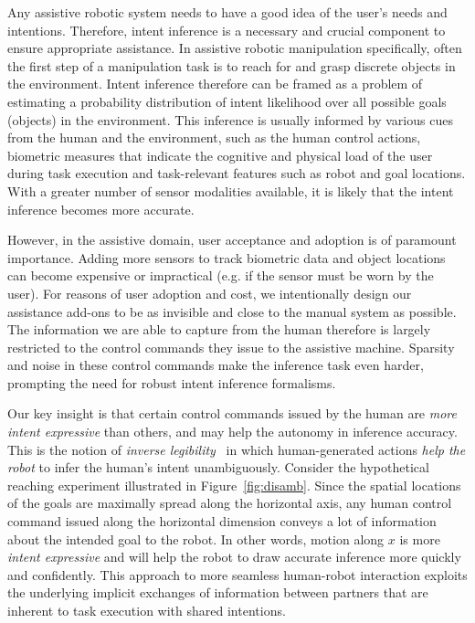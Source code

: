 \documentclass[natbib, twocolumn]{svjour3}          %
\begin{document}
Any assistive robotic system needs to have a good idea of the user's needs and intentions. Therefore, intent inference is a necessary and crucial component to ensure appropriate assistance. In assistive robotic manipulation specifically, often the first step of a manipulation task is to reach for and grasp discrete objects in the environment. Intent inference therefore can be framed as a problem of estimating a probability distribution of intent likelihood over all possible goals (objects) in the environment. This inference is usually informed by various cues from the human and the environment, such as the human control actions, biometric measures that indicate the cognitive and physical load of the user during task execution and task-relevant features such as robot and goal locations. With a greater number of sensor modalities available, it is likely that the intent inference becomes more accurate. 

However, in the assistive domain, user acceptance and adoption is of paramount importance. Adding more sensors to track biometric data and object locations can become expensive or impractical (e.g. if the sensor must be worn by the user). For reasons of user adoption and cost, we intentionally design our assistance add-ons to be as invisible and close to the manual system as possible. The information we are able to capture from the human therefore is largely restricted to the control commands they issue to the assistive machine. Sparsity and noise in these control commands make the inference task even harder, prompting the need for robust intent inference formalisms. 

Our key insight is that certain control commands issued by the human are \textit{more intent expressive} than others, and may help the autonomy in inference accuracy. This is the notion of \textit{inverse legibility}~\citep{gopinath2017mode} in which human-generated actions \textit{help the robot} to infer the human's intent unambiguously. Consider the hypothetical reaching experiment illustrated in Figure~\ref{fig:disamb}. Since the spatial locations of the goals are maximally spread along the horizontal axis, any human control command issued along the horizontal dimension conveys a lot of information about the intended goal to the robot. In other words, motion along $x$ is more \textit{intent expressive} and will help the robot to draw accurate inference more quickly and confidently. This approach to more seamless human-robot interaction exploits the underlying implicit exchanges of information between partners that are inherent to task execution with shared intentions. 
\end{document}
